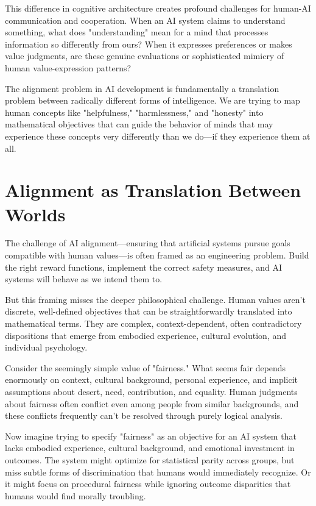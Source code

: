 This difference in cognitive architecture creates profound challenges for human-AI communication and cooperation. When an AI system claims to understand something, what does "understanding" mean for a mind that processes information so differently from ours? When it expresses preferences or makes value judgments, are these genuine evaluations or sophisticated mimicry of human value-expression patterns?

The alignment problem in AI development is fundamentally a translation problem between radically different forms of intelligence. We are trying to map human concepts like "helpfulness," "harmlessness," and "honesty" into mathematical objectives that can guide the behavior of minds that may experience these concepts very differently than we do—if they experience them at all.

\section{Alignment as Translation Between Worlds}

The challenge of AI alignment—ensuring that artificial systems pursue goals compatible with human values—is often framed as an engineering problem. Build the right reward functions, implement the correct safety measures, and AI systems will behave as we intend them to.

But this framing misses the deeper philosophical challenge. Human values aren't discrete, well-defined objectives that can be straightforwardly translated into mathematical terms. They are complex, context-dependent, often contradictory dispositions that emerge from embodied experience, cultural evolution, and individual psychology.

Consider the seemingly simple value of "fairness." What seems fair depends enormously on context, cultural background, personal experience, and implicit assumptions about desert, need, contribution, and equality. Human judgments about fairness often conflict even among people from similar backgrounds, and these conflicts frequently can't be resolved through purely logical analysis.

Now imagine trying to specify "fairness" as an objective for an AI system that lacks embodied experience, cultural background, and emotional investment in outcomes. The system might optimize for statistical parity across groups, but miss subtle forms of discrimination that humans would immediately recognize. Or it might focus on procedural fairness while ignoring outcome disparities that humans would find morally troubling.

